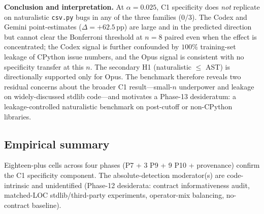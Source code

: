 \textbf{Conclusion and interpretation.} At $\alpha = 0.025$, C1 specificity does \emph{not} replicate on naturalistic \texttt{csv.py} bugs in any of the three families ($0/3$). The Codex and Gemini point-estimates ($\Delta = +62.5\,\mathrm{pp}$) are large and in the predicted direction but cannot clear the Bonferroni threshold at $n = 8$ paired even when the effect is concentrated; the Codex signal is further confounded by $100\%$ training-set leakage of CPython issue numbers, and the Opus signal is consistent with no specificity transfer at this $n$. The secondary H1 (naturalistic $\le$ AST) is directionally supported only for Opus. The benchmark therefore reveals two residual concerns about the broader C1 result---small-$n$ underpower and leakage on widely-discussed stdlib code---and motivates a Phase-13 desideratum: a leakage-controlled naturalistic benchmark on post-cutoff or non-CPython libraries.

\subsection{Empirical summary}

Eighteen-plus cells across four phases (P7 + 3 P9 + 9 P10 + provenance) confirm the C1 specificity component. The absolute-detection moderator(s) are code-intrinsic and unidentified (Phase-12 desiderata: contract informativeness audit, matched-LOC stdlib/third-party experiments, operator-mix balancing, no-contract baseline).
